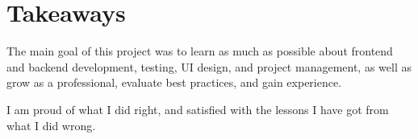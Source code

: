 \section{Takeaways}\label{sec:takeaways}

The main goal of this project
was to learn as much as possible about
frontend and backend development,
testing,
UI design, and
project management,
as well as grow as a professional,
evaluate best practices,
and gain experience.

I am proud of what I did right,
and satisfied with the lessons
I have got from what I did wrong.



